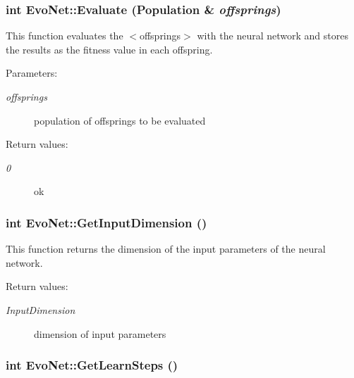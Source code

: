 \subsubsection{\setlength{\rightskip}{0pt plus 5cm}int Evo\-Net::Evaluate (Population \& {\em offsprings})}\label{classEvoNet_a8}


This function evaluates the $<$offsprings$>$ with the neural network and stores the results as the fitness value in each offspring.

\begin{Desc}
\item[Parameters: ]\par
\begin{description}
\item[{\em 
offsprings}]population of offsprings to be evaluated \end{description}
\end{Desc}
\begin{Desc}
\item[Return values: ]\par
\begin{description}
\item[{\em 
0}]ok \end{description}
\end{Desc}
\subsubsection{\setlength{\rightskip}{0pt plus 5cm}int Evo\-Net::Get\-Input\-Dimension ()}\label{classEvoNet_a16}


This function returns the dimension of the input parameters of the neural network.

\begin{Desc}
\item[Return values: ]\par
\begin{description}
\item[{\em 
Input\-Dimension}]dimension of input parameters \end{description}
\end{Desc}
\subsubsection{\setlength{\rightskip}{0pt plus 5cm}int Evo\-Net::Get\-Learn\-Steps ()}\label{classEvoNet_a14}


